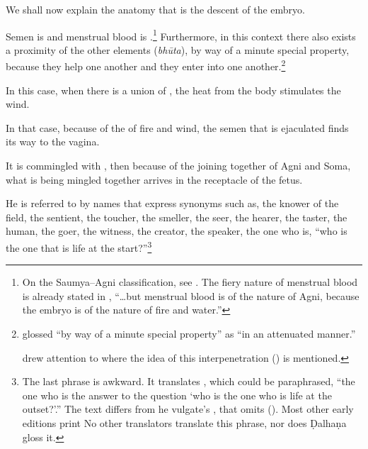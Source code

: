 \begin{translation}


\item[1] 

We shall now explain the anatomy that is the descent of the embryo. 


\item[3]

Semen is  and menstrual blood is
.\footnote{On the Saumya--Agni
    classification, see \cites{wuja-2004}{ange-2021}[521--527]{das-2003}. 
    The fiery nature of menstrual blood is already stated in
    , “\ldots but menstrual blood is of the nature of
    Agni, because the embryo is of the nature of fire and water.”} 
Furthermore, in this context there also exists a proximity of the
other elements (\emph{bhūta}), by way of a minute
special property,
because they help one another and they enter into one
another.\footnote{ glossed 
    “by way of a minute special property” as  “in an
    attenuated manner.”
        
         drew attention
        to  where the idea of this interpenetration
        () is mentioned.}


\item [4]

In this case,
when there is a union of ,
the heat from the body stimulates the wind.

In that case, 
because of the  of fire and wind,
the semen that is ejaculated finds its way to the vagina. 

It is commingled with , then because
of the joining together of Agni and Soma, what is being mingled together
arrives in the receptacle of the fetus. 

He is referred to by names that express synonyms such as, the knower
of the field, the sentient, the toucher, the smeller, the seer, the
hearer, the taster, the human, the goer, the witness, the creator, the
speaker, the one who is, “who is the one that is life at the
start?”\footnote{The last phrase is awkward.  It translates , which could be paraphrased, “the one who is the
    answer to the question `who is the one who is life at the outset?'.” 
    The text differs from he vulgate's , that omits 
    (). Most other early editions print 
    No other translators translate this phrase, nor does Ḍalhaṇa gloss
    it.}



\end{translation}
